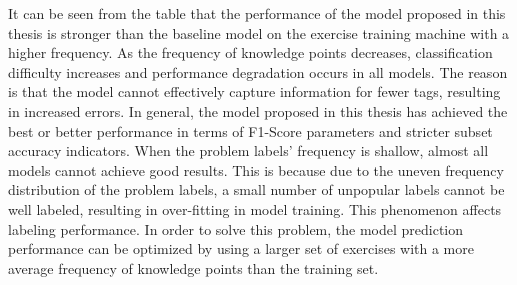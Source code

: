 It can be seen from the table that the performance of the model proposed in this thesis is stronger than the baseline model on the exercise training machine with a higher frequency. As the frequency of knowledge points decreases, classification difficulty increases and performance degradation occurs in all models. The reason is that the model cannot effectively capture information for fewer tags, resulting in increased errors. In general, the model proposed in this thesis has achieved the best or better performance in terms of F1-Score parameters and stricter subset accuracy indicators. When the problem labels' frequency is shallow, almost all models cannot achieve good results. This is because due to the uneven frequency distribution of the problem labels, a small number of unpopular labels cannot be well labeled, resulting in over-fitting in model training. This phenomenon affects labeling performance. In order to solve this problem, the model prediction performance can be optimized by using a larger set of exercises with a more average frequency of knowledge points than the training set.




